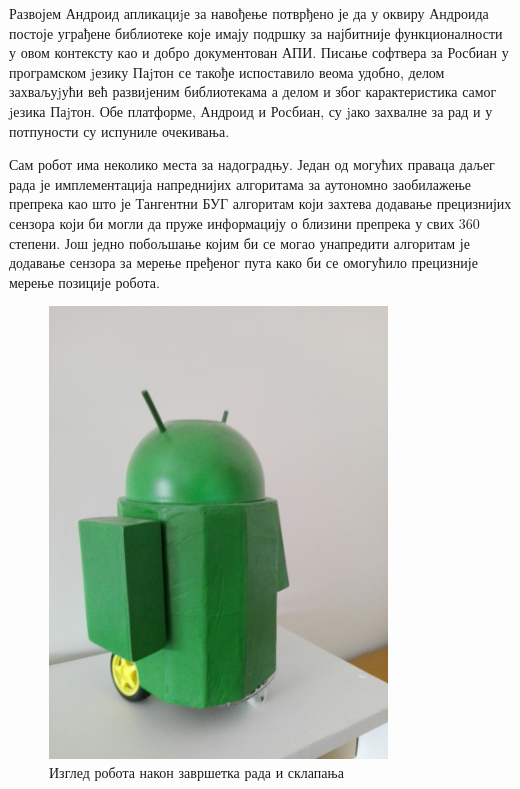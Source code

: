 \documentclass[12pt,oneside]{memoir}
\theoremstyle{remark}
\begin{document}
Развојем Андроид апликациjе за навођење потврђено је да у оквиру Андроида постоје уграђене библиотеке које имају подршку за најбитније функционалности у овом контексту као и добро документован АПИ. Писање софтвера за Росбиан у програмском jезику Паjтон се такође испоставило веома удобно, делом захваљуjући већ развиjеним библиотекама а делом и због карактеристика самог jезика Паjтон. Обе платформе, Андроид и Росбиан, су jако захвалне за рад и у потпуности су испуниле очекивања.

Сам робот има неколико места за надоградњу. Један од могућих праваца даљег рада је имплементација напреднијих алгоритама за аутономно заобилажење препрека као што је Тангентни БУГ алгоритам који захтева додавање прецизнијих сензора који би могли да пруже информацију о близини препрека у свих 360 степени. Још једно побољшање којим би се могао унапредити алгоритам је додавање сензора за мерење пређеног пута како би се омогућило прецизније мерење позиције робота.  

\begin{figure}[!ht]
\centering
\includegraphics[width=0.80\textwidth]{slike/final.jpg}
\caption{Изглед робота након завршетка рада и склапања}
\label{fig:finalrobot}
\end{figure}
\end{document}
